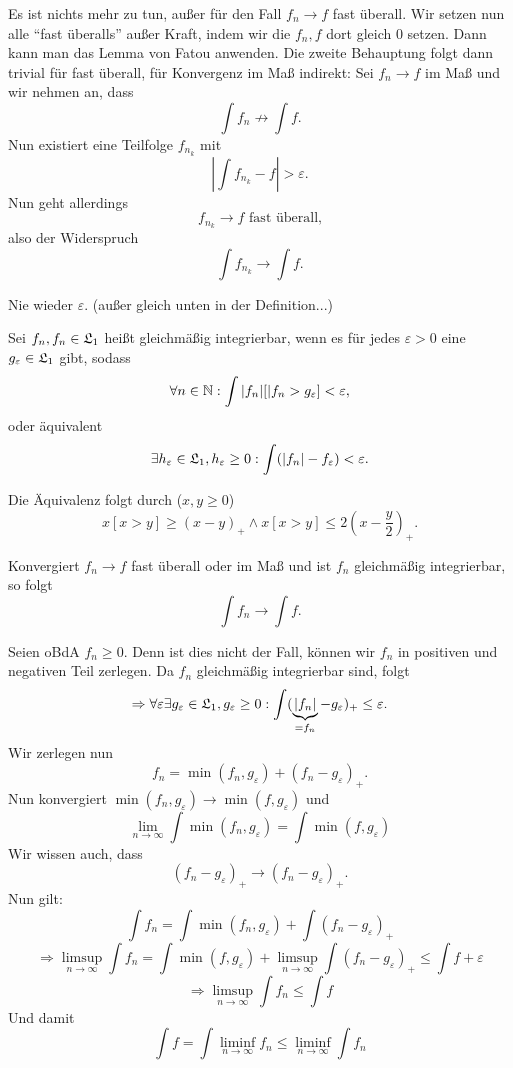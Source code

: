 			\begin{bew}
				Es ist nichts mehr zu tun, außer für den Fall $f_n\to f$ fast überall. Wir setzen nun alle "`fast überalls"' außer Kraft, indem wir die $f_n,f$ dort gleich 0 setzen. Dann kann man das Lemma von Fatou anwenden. \newline
				Die zweite Behauptung folgt dann trivial für fast überall, für Konvergenz im Maß indirekt: Sei $f_n\to f$ im Maß und wir nehmen an, dass
				\[ \int f_n\not\to\int f. \]
				Nun existiert eine Teilfolge $f_{n_k}$ mit 
				\[ \left|\int f_{n_k}-f\right|>\varepsilon. \]
				Nun geht allerdings 
				\[ f_{n_k}\to f\text{ fast überall,} \]
				also der Widerspruch
				\[ \int f_{n_k}\to\int f. \]
			\end{bew}
			
			\begin{bem}
				Nie wieder $\varepsilon$. (außer gleich unten in der Definition...)
			\end{bem}
			
			\begin{defi}
				Sei $f_n, f_n\in\mathfrak{L}_1$ heißt gleichmäßig integrierbar, wenn es für jedes $\varepsilon>0$ eine $g_\varepsilon\in\mathfrak{L}_1$ gibt, sodass
				\[ \forall n\in\mathbb{N}: \int |f_n|[|f_n>g_\varepsilon]<\varepsilon,  \]
				oder äquivalent
				\[ \exists h_\varepsilon\in\mathfrak{L}_1, h_\varepsilon\ge 0: \int (|f_n|-f_\varepsilon)<\varepsilon. \]
			\end{defi}
			
			\begin{bew}
				Die Äquivalenz folgt durch ($x,y\ge 0$)
				\[ x[x>y]\ge(x-y)_+ \land x[x>y]\le 2(x-\frac{y}{2})_+.\]
			\end{bew}
			
			\begin{satz}
				Konvergiert $f_n\to f$ fast überall oder im Maß und ist $f_n$ gleichmäßig integrierbar, so folgt
				\[ \int f_n\to\int f. \]
			\end{satz}
			
			\begin{bew}
				Seien oBdA $f_n\ge 0$. Denn ist dies nicht der Fall, können wir $f_n$ in positiven und negativen Teil zerlegen. Da $f_n$ gleichmäßig integrierbar sind, folgt
				\[ \Rightarrow \forall\varepsilon\exists g_\varepsilon\in\mathfrak{L}_1,  g_\varepsilon\ge 0: \int (\underbrace{|f_n|}_{=f_n}-g_\varepsilon)_+\le \varepsilon. \]
				Wir zerlegen nun
				\[ f_n=\min(f_n,g_\varepsilon)+(f_n-g_\varepsilon)_+. \]
				Nun konvergiert $\min(f_n,g_\varepsilon)\to \min(f,g_\varepsilon)$ und 
				\[ \lim_{n\to\infty}\int\min(f_n,g_\varepsilon)=\int\min(f,g_\varepsilon)  \]
				Wir wissen auch, dass
				\[ (f_n-g_\varepsilon)_+\to(f_n-g_\varepsilon)_+. \]
				Nun gilt:
				\[ \int f_n=\int \min(f_n,g_\varepsilon)+\int(f_n-g_\varepsilon)_+ \]
				\[ \Rightarrow\limsup_{n\to\infty} \int f_n=\int\min(f,g_\varepsilon)+\limsup_{n\to\infty} \int (f_n-g_\varepsilon)_+\le\int f+\varepsilon \]
				\[ \Rightarrow\limsup_{n\to\infty}\int f_n\le\int f \]
				Und damit
				\[ \int f=\int \liminf_{n\to\infty} f_n\le \liminf_{n\to\infty} \int f_n \]
			\end{bew}
			
